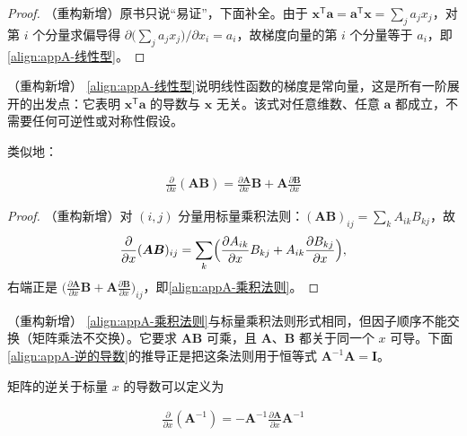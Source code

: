 \documentclass[../main.tex]{subfiles}
\begin{document}
\begin{proof}
（重构新增）原书只说“易证”，下面补全。由于 $\bm{x}^{\mathsf{T}}\bm{a}=\bm{a}^{\mathsf{T}}\bm{x}=\sum_j a_jx_j$，对第 $i$ 个分量求偏导得 $\partial\bigl(\sum_j a_jx_j\bigr)/\partial x_i=a_i$，故梯度向量的第 $i$ 个分量等于 $a_i$，即\eqref{align:appA-线性型}。
\end{proof}

\begin{remark}（重构新增）
\eqref{align:appA-线性型}说明线性函数的梯度是常向量，这是所有一阶展开的出发点：它表明 $\bm{x}^{\mathsf{T}}\bm{a}$ 的导数与 $\bm{x}$ 无关。该式对任意维数、任意 $\bm{a}$ 都成立，不需要任何可逆性或对称性假设。
\end{remark}

类似地：
\begin{proposition}[矩阵乘积的导数]\label{proposition:appA-乘积法则}
\begin{align}
  \frac{\partial}{\partial x}(\bm{A}\bm{B})=\frac{\partial\bm{A}}{\partial x}\bm{B}+\bm{A}\frac{\partial\bm{B}}{\partial x}
  \label{align:appA-乘积法则}
\end{align}
\end{proposition}

\begin{proof}
（重构新增）对 $(i,j)$ 分量用标量乘积法则：$(\bm{A}\bm{B})_{ij}=\sum_k A_{ik}B_{kj}$，故
\begin{align*}
  \frac{\partial}{\partial x}(\bm{A}\bm{B})_{ij}=\sum_k\Bigl(\frac{\partial A_{ik}}{\partial x}B_{kj}+A_{ik}\frac{\partial B_{kj}}{\partial x}\Bigr),
\end{align*}
右端正是 $\bigl(\frac{\partial\bm{A}}{\partial x}\bm{B}+\bm{A}\frac{\partial\bm{B}}{\partial x}\bigr)_{ij}$，即\eqref{align:appA-乘积法则}。
\end{proof}

\begin{remark}（重构新增）
\eqref{align:appA-乘积法则}与标量乘积法则形式相同，但因子顺序不能交换（矩阵乘法不交换）。它要求 $\bm{A}\bm{B}$ 可乘，且 $\bm{A}$、$\bm{B}$ 都关于同一个 $x$ 可导。下面\eqref{align:appA-逆的导数}的推导正是把这条法则用于恒等式 $\bm{A}^{-1}\bm{A}=\bm{I}$。
\end{remark}

矩阵的逆关于标量 $x$ 的导数可以定义为
\begin{proposition}[逆矩阵的导数]\label{proposition:appA-逆矩阵的导数}
\begin{align}
  \frac{\partial}{\partial x}(\bm{A}^{-1})=-\bm{A}^{-1}\frac{\partial\bm{A}}{\partial x}\bm{A}^{-1}
  \label{align:appA-逆的导数}
\end{align}
\end{proposition}
\end{document}

